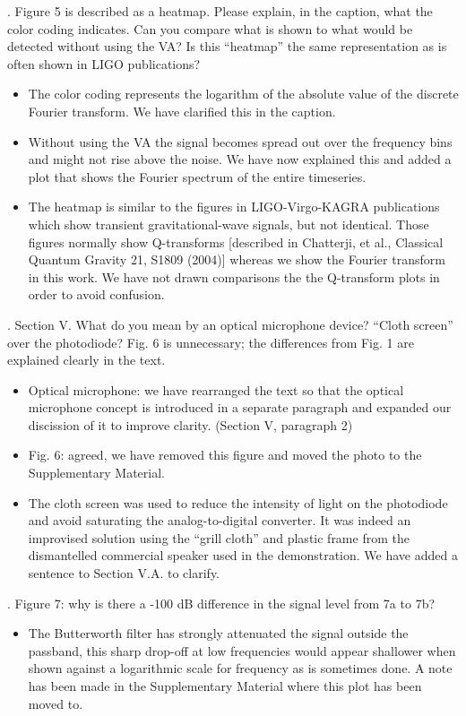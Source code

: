 \documentclass{article}
\newcommand{\todo}{\textcolor{blue}}
\begin{document}
. Figure 5 is described as a heatmap.  Please explain, in the caption, what the color coding indicates.  Can you compare what is shown to what would be detected without using the VA?  Is this ``heatmap'' the same representation as is often shown in LIGO publications?
\begin{itemize}
\item The color coding represents the logarithm of the absolute value of the discrete Fourier transform. We have clarified this in the caption.
\item Without using the VA the signal becomes spread out over the frequency bins and might not rise above the noise. We have now explained this and added a plot that shows the Fourier spectrum of the entire timeseries.
\item The heatmap is similar to the figures in LIGO-Virgo-KAGRA publications which show transient gravitational-wave signals, but not identical. Those figures normally show Q-transforms [described in Chatterji, et al., Classical Quantum Gravity 21, S1809 (2004)] whereas we show the Fourier transform in this work. We have not drawn comparisons the the Q-transform plots in order to avoid confusion.
\end{itemize}


. Section V.  What do you mean by an optical microphone device?  “Cloth screen” over the photodiode?  Fig. 6 is unnecessary; the differences from Fig. 1 are explained clearly in the text.
\begin{itemize}
\item Optical microphone: we have rearranged the text so that the optical microphone concept is introduced in a separate paragraph and expanded our discission of it to improve clarity. (Section V, paragraph 2)
\item Fig. 6: agreed, we have removed this figure and moved the photo to the Supplementary Material.
\item The cloth screen was used to reduce the intensity of light on the photodiode and avoid saturating the analog-to-digital converter. It was indeed an improvised solution using the ``grill cloth'' and plastic frame from the dismantelled commercial speaker used in the demonstration. We have added a sentence to Section V.A. to clarify.
\end{itemize}  



. Figure 7: why is there a -100 dB difference in the signal level from 7a to 7b?  
\begin{itemize}
\item The Butterworth filter has strongly attenuated the signal outside the passband, this sharp drop-off at low frequencies would appear shallower when shown against a logarithmic scale for frequency as is sometimes done. A note has been made in the Supplementary Material where this plot has been moved to.
\end{itemize}
\end{document}
